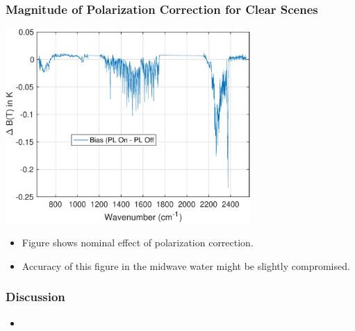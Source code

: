 \documentclass[10pt,t]{beamer} \usepackage[utf8]{inputenc}
\begin{document}
%
\begin{frame}
  \frametitle{Magnitude of Polarization Correction for Clear Scenes}
  \vspace{-0.125in} %
  \begin{center}
    \noindent\includegraphics[width=0.7\textwidth]{Figs/bias_on_minus_bias_off.pdf}
  \end{center}
\vspace{-0.05in}
  \begin{itemize}
    \item Figure shows nominal effect of polarization correction.
    \item Accuracy of this figure in the midwave water might be slightly compromised.
      \end{itemize}
    \end{frame}

%
\begin{frame}
  \frametitle{Discussion}
  \vspace{-0.1 in}
  \begin{itemize}
     \item 
  \end{itemize}

  
\end{frame}
\end{document}
